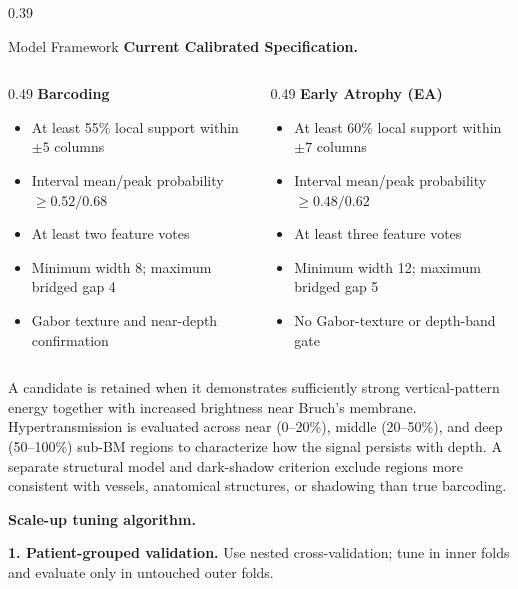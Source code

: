\documentclass[final]{beamer}
\begin{document}
\begin{frame}[t]
\begin{columns}[t,totalwidth=\dimexpr\paperwidth-4cm\relax]
\begin{column}{0.39\textwidth}
\begin{block}{Model Framework}
    \vspace{0.4cm}
    \textbf{Current Calibrated Specification.}
    \begin{columns}[t,totalwidth=\linewidth]
      \begin{column}{0.49\linewidth}
        \textcolor{BarcodeRed}{\textbf{Barcoding}}
        \begin{itemize}
          \item At least 55\% local support within $\pm5$ columns
          \item Interval mean/peak probability $\geq0.52/0.68$
          \item At least two feature votes
          \item Minimum width 8; maximum bridged gap 4
          \item Gabor texture and near-depth confirmation
        \end{itemize}
      \end{column}
      \begin{column}{0.49\linewidth}
        \textcolor{EAOrange}{\textbf{Early Atrophy (EA)}}
        \begin{itemize}
          \item At least 60\% local support within $\pm7$ columns
          \item Interval mean/peak probability $\geq0.48/0.62$
          \item At least three feature votes
          \item Minimum width 12; maximum bridged gap 5
          \item No Gabor-texture or depth-band gate
        \end{itemize}
      \end{column}
    \end{columns}

    A candidate is retained when it demonstrates sufficiently strong vertical-pattern energy together with increased brightness near Bruch’s membrane. Hypertransmission is evaluated across near (0--20\%), middle (20--50\%), and deep (50--100\%) sub-BM regions to characterize how the signal persists with depth. A separate structural model and dark-shadow criterion exclude regions more consistent with vessels, anatomical structures, or shadowing than true barcoding.

    \vspace{0.25cm}
    {%
    \textbf{Scale-up tuning algorithm.}

        \textbf{1. Patient-grouped validation.} Use nested cross-validation;
        tune in inner folds and evaluate only in untouched outer folds.

}
\end{block}
\end{column}
\end{columns}
\end{frame}
\end{document}
